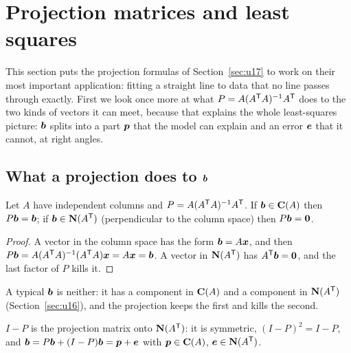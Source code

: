 \section{Projection matrices and least squares}\label{sec:u18}

This section puts the projection formulas of Section~\ref{sec:u17} to work on their most
important application: fitting a straight line to data that no line passes through exactly.
First we look once more at what $P=A(A^{\mathsf{T}} A)^{-1}A^{\mathsf{T}}$ does to the two kinds of vectors it can
meet, because that explains the whole least-squares picture: $\boldsymbol{b}$ splits into a part
$\boldsymbol{p}$ that the model can explain and an error $\boldsymbol{e}$ that it cannot, at right angles.

\subsection{What a projection does to \texorpdfstring{$\boldsymbol{b}$}{b}}

\begin{proposition}\label{prop:u18-extremes}
Let $A$ have independent columns and $P=A(A^{\mathsf{T}} A)^{-1}A^{\mathsf{T}}$.
If $\boldsymbol{b}\in\mathbf{C}(A)$ then $P\boldsymbol{b}=\boldsymbol{b}$; if $\boldsymbol{b}\in\mathbf{N}(A^{\mathsf{T}})$ (perpendicular to the
column space) then $P\boldsymbol{b}=\boldsymbol{0}$.
\end{proposition}

\begin{proof}
A vector in the column space has the form $\boldsymbol{b}=A\boldsymbol{x}$, and then
$P\boldsymbol{b}=A(A^{\mathsf{T}} A)^{-1}(A^{\mathsf{T}} A)\boldsymbol{x}=A\boldsymbol{x}=\boldsymbol{b}$. A vector in $\mathbf{N}(A^{\mathsf{T}})$ has
$A^{\mathsf{T}}\boldsymbol{b}=\boldsymbol{0}$, and the last factor of $P$ kills it.
\end{proof}

A typical $\boldsymbol{b}$ is neither: it has a component in $\mathbf{C}(A)$ and a component in $\mathbf{N}(A^{\mathsf{T}})$
(Section~\ref{sec:u16}), and the projection keeps the first and kills the second.

\begin{proposition}\label{prop:u18-iminusp}
$I-P$ is the projection matrix onto $\mathbf{N}(A^{\mathsf{T}})$: it is symmetric, $(I-P)^2=I-P$, and
$\boldsymbol{b}=P\boldsymbol{b}+(I-P)\boldsymbol{b}=\boldsymbol{p}+\boldsymbol{e}$ with $\boldsymbol{p}\in\mathbf{C}(A)$, $\boldsymbol{e}\in\mathbf{N}(A^{\mathsf{T}})$.
\end{proposition}

